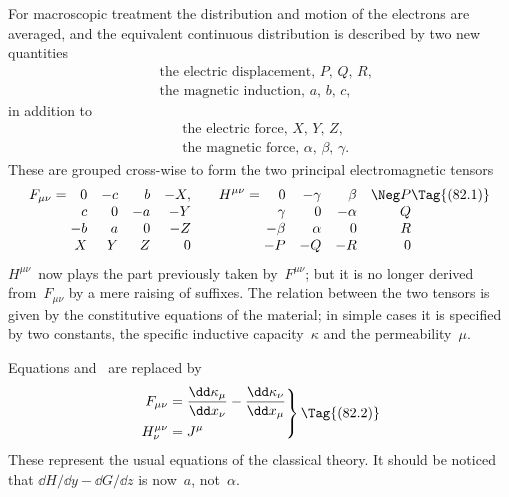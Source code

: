 \documentclass[12pt]{book}
\begin{document}
For macroscopic treatment the distribution and motion of the electrons are
averaged, and the equivalent continuous distribution is described by two new
quantities
\begin{align*}
&\text{the electric displacement, $P$, $Q$, $R$,} \\
&\text{the magnetic induction, $a$, $b$, $c$,}
\end{align*}
in addition to
\begin{align*}
&\text{the electric force, $X$, $Y$, $Z$,} \\
  &\text{the magnetic force, $\alpha$, $\beta$, $\gamma$.}
\end{align*}
These are grouped cross-wise to form the two principal electromagnetic tensors
\[
F_{\mu\nu} = \begin{array}[t]{@{}r@{\quad}r@{\quad}r@{\quad}r@{}}
   0 & -c &  b & -X,\\
   c &  0 & -a & -Y\\
  -b &  a &  0 & -Z\\
   X &  Y &  Z &  0\\
\end{array}\qquad
H^{\mu\nu} = \begin{array}[t]{@{}r@{\quad}r@{\quad}r@{\quad}r@{}}
  0 & -\gamma & \beta & \Neg P\\
  \gamma & 0 & -\alpha & Q\\
  -\beta & \alpha & 0 & R\\
  -P & -Q & -R & 0\\
\end{array}
\Tag{(82.1)}
\]
$H^{\mu\nu}$~now plays the part previously taken by~$F^{\mu\nu}$; but it is no longer derived
from~$F_{\mu\nu}$ by a mere raising of suffixes. The relation between the two tensors
is given by the constitutive equations of the material; in simple cases it is
%
specified by two constants, the specific inductive capacity~$\kappa$ and the permeability~$\mu$.
%

Equations  and~ are replaced by
\[
\left.
\begin{aligned}
  F_{\mu\nu} &= \frac{\dd\kappa_{\mu}}{\dd x_{\nu}} - \frac{\dd\kappa_{\nu}}{\dd x_{\mu}}\\
  H_{\nu}^{\mu\nu} &= J^{\mu}
\end{aligned}
\right\}
\Tag{(82.2)}
\]
These represent the usual equations of the classical theory. It should be
noticed that $\dd H/\dd y - \dd G/\dd z$ is now~$a$, not~$\alpha$.
\end{document}

